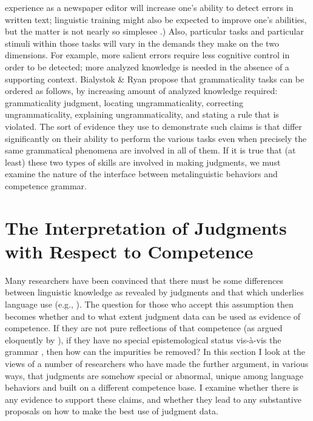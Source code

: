  experience as a newspaper editor will increase one's ability to detect errors in written text; linguistic training might also be expected to improve one's abilities, but the matter is not nearly so simple\schdash{}see .) Also, particular tasks and particular stimuli within those tasks will vary in the demands they make on the two dimensions. For example, more salient errors require less cognitive control in order to be detected; more analyzed knowledge is needed in the absence of a supporting context. Bialystok \& Ryan propose that grammaticality tasks can be ordered as follows, by increasing amount of analyzed knowledge required: grammaticality judgment, locating ungrammaticality, correcting ungrammaticality, explaining ungrammaticality, and stating a rule that is violated. The sort of evidence they use to demonstrate such claims is that  differ significantly on their ability to perform the various tasks even when precisely the same grammatical phenomena are involved in all of them. If it is true that (at least) these two types of skills are involved in making judgments, we must examine the nature of the interface between metalinguistic behaviors and competence grammar.


\section{The Interpretation of Judgments with Respect to Competence}\label{sec:3.5}

Many researchers have been convinced that there must be some differences between linguistic knowledge as revealed by judgments and that which underlies language use (e.g., \citet{CardenEtAl1981}). The question for those who accept this assumption then becomes whether and to what extent judgment data can be used as evidence of competence. If they are not pure reflections of that competence (as argued eloquently by \citet[vol. 3: 5\textendash{}7]{Levelt1974}), if they have no special epistemological status vis-à-vis the grammar \citep{LeveltEtAl1978}, then how can the impurities be removed? In this section I look at the views of a number of researchers who have made the further argument, in various ways, that judgments are somehow special or abnormal, unique among language behaviors and built on a different competence base. I examine whether there is any evidence to support these claims, and whether they lead to any substantive proposals on how to make the best use of judgment data.

